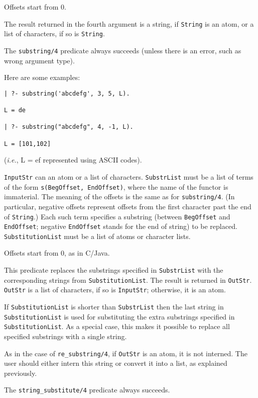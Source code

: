 \begin{description}
Offsets start from 0.

The result returned in the fourth argument is a string, if {\tt String} is
an atom, or a list of characters, if so is {\tt String}.

The \verb|substring/4| predicate always succeeds (unless there is an error,
such as wrong argument type).

Here are some examples: 
\begin{verbatim}
| ?- substring('abcdefg', 3, 5, L).

L = de

| ?- substring("abcdefg", 4, -1, L).

L = [101,102]
\end{verbatim}
({\it i.e.}, L = ef represented using ASCII codes).


{\tt InputStr} can an atom or a list of characters.  {\tt SubstrList} must
be a list of terms of the form {\tt s(BegOffset, EndOffset)}, where the
name of the functor is immaterial.  The meaning of the offsets is the same
as for {\tt substring/4}. (In particular, negative offsets represent
offsets from the first character past the end of {\tt String}.)  Each such
term specifies a substring (between {\tt BegOffset} and {\tt EndOffset};
negative {\tt EndOffset} stands for the end of string) to be replaced.
{\tt SubstitutionList} must be a list of atoms or character lists.

Offsets start from 0, as in C/Java.

This predicate replaces the substrings specified in {\tt SubstrList} with
the corresponding strings from {\tt SubstitutionList}.  The result is
returned in {\tt OutStr}. {\tt OutStr} is a list of characters, if so is
{\tt InputStr}; otherwise, it is an atom.

If {\tt SubstitutionList} is shorter than {\tt SubstrList} then the last
string in {\tt SubstitutionList} is used for substituting the extra
substrings specified in {\tt SubstitutionList}. As a special case, this
makes it possible to replace all specified substrings with a single string.

As in the case of {\tt re\_substring/4}, if {\tt OutStr} is an atom, it is
not interned.  The user should either intern this string or convert it into
a list, as explained previously.

The \verb|string_substitute/4| predicate always succeeds.


\end{description}
